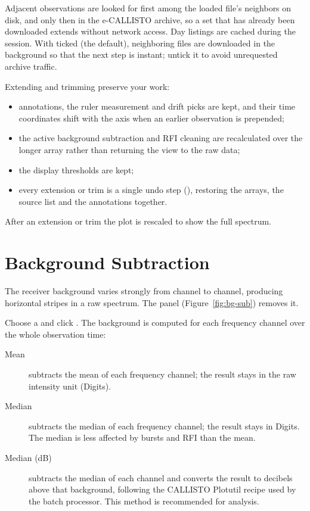 Adjacent observations are looked for first among the loaded file's neighbors on disk, and
only then in the e-CALLISTO archive, so a set that has already been downloaded extends
without network access. Day listings are cached during the session. With
 ticked (the default), neighboring files are
downloaded in the background so that the next step is instant; untick it to avoid
unrequested archive traffic.

Extending and trimming preserve your work:
\begin{itemize}
  \item annotations, the ruler measurement and drift picks are kept, and their time
    coordinates shift with the axis when an earlier observation is prepended;
  \item the active background subtraction and RFI cleaning are recalculated over the
    longer array rather than returning the view to the raw data;
  \item the display thresholds are kept;
  \item every extension or trim is a single undo step (), restoring the arrays,
    the source list and the annotations together.
\end{itemize}
After an extension or trim the plot is rescaled to show the full spectrum.

\section{Background Subtraction}
\label{sec:background}

The receiver background varies strongly from channel to channel, producing horizontal
stripes in a raw spectrum. The  panel
(Figure~\ref{fig:bg-sub}) removes it.


Choose a  and click . The background is computed for
each frequency channel over the whole observation time:
\begin{description}
  \item[Mean] subtracts the mean of each frequency channel; the result stays in the raw
    intensity unit (Digits).
  \item[Median] subtracts the median of each frequency channel; the result stays in
    Digits. The median is less affected by bursts and RFI than the mean.
  \item[Median (dB)] subtracts the median of each channel and converts the result to
    decibels above that background, following the CALLISTO Plotutil recipe used by the
    batch processor. This method is recommended for analysis.
\end{description}

